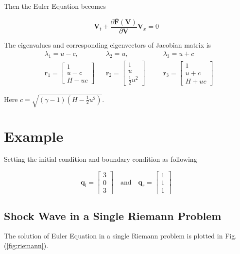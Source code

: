\documentclass[11pt]{diazessay} %
\begin{document}
    Then the Euler Equation becomes 

    $$
    \textbf{V}_t + \frac{\partial \bar{\textbf{F}}(\textbf{V})}{\partial \textbf{V}}\textbf{V}_x= 0
    $$

    The eigenvalues and corresponding eigenvectors of Jacobian matrix is
    $$
    \begin{aligned}
        & \lambda_1 = u -c, &&\lambda_2 = u,\quad && \lambda_3 = u+c\\
        &\textbf{r}_1 =\begin{bmatrix} 1 \\ u-c \\H-uc\end{bmatrix}
        &&\textbf{r}_2 =\begin{bmatrix} 1 \\ u \\ \frac{1}{2}u^2 \end{bmatrix}\quad
        &&\textbf{r}_3 =\begin{bmatrix} 1\\ u+c \\H+uc\end{bmatrix}
    \end{aligned}
    $$

    Here $c=\sqrt{(\gamma - 1)(H-\frac{1}{2}u^2)}$\cite{david_i_ketcheson_chapter_2020}.


\section{Example}

Setting the initial condition and boundary condition as following

$$
    \textbf{q}_l = \begin{bmatrix}
        3\\0\\3
    \end{bmatrix}
    \quad \mbox{and}\quad
    \textbf{q}_r = \begin{bmatrix}
        1\\1\\1
    \end{bmatrix}
$$
\subsection{Shock Wave in a Single Riemann Problem}

The solution of Euler Equation in a single Riemann problem is plotted in Fig.(\ref{fig:riemann}).
\end{document}
